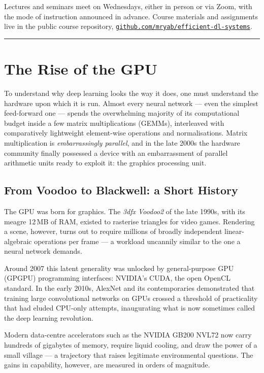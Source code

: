 \documentclass[11pt,a4paper]{article}
\theoremstyle{definition}
\theoremstyle{remark}
\theoremstyle{plain}
\begin{document}
Lectures and seminars meet on Wednesdays, either in person or via
Zoom, with the mode of instruction announced in advance. Course
materials and assignments live in the public course repository,
\href{https://github.com/mryab/efficient-dl-systems}{\texttt{github.com/mryab/efficient-dl-systems}}.

\bigskip\hrule\bigskip

\section{The Rise of the GPU}

To understand why deep learning looks the way it does, one must
understand the hardware upon which it is run. Almost every neural
network --- even the simplest feed-forward one --- spends the
overwhelming majority of its computational budget inside a few
matrix multiplications (GEMMs), interleaved with comparatively
lightweight element-wise operations and normalisations.
Matrix multiplication is \emph{embarrassingly parallel}, and in the
late 2000s the hardware community finally possessed a device with an
embarrassment of parallel arithmetic units ready to exploit it: the
graphics processing unit.

\subsection{From Voodoo to Blackwell: a Short History}

The GPU was born for graphics. The \textit{3dfx Voodoo2} of the late
1990s, with its meagre 12\,MB of RAM, existed to rasterise triangles
for video games. Rendering a scene, however, turns out to require
millions of broadly independent linear-algebraic operations per
frame --- a workload uncannily similar to the one a neural network
demands.

Around 2007 this latent generality was unlocked by general-purpose
GPU (GPGPU) programming interfaces: NVIDIA's CUDA, the open OpenCL
standard. In the early 2010s, AlexNet and its
contemporaries demonstrated that training large convolutional
networks on GPUs crossed a threshold of practicality that had
eluded CPU-only attempts, inaugurating what is now sometimes called
the deep learning revolution.

Modern data-centre accelerators such as the NVIDIA GB200 NVL72 now
carry hundreds of gigabytes of memory, require liquid cooling, and
draw the power of a small village --- a trajectory that raises
legitimate environmental questions. The gains in capability,
however, are measured in orders of magnitude.
\end{document}
